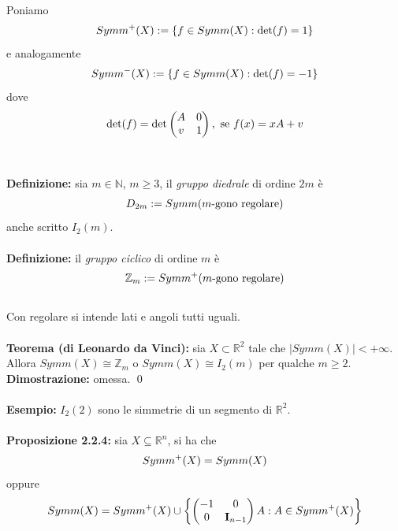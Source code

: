 \documentclass{article}
\begin{document}
Poniamo
\begin{gather}
    Symm^+(X) := \{ f \in Symm(X) : \det (f) = 1 \} \notag
\end{gather}
e analogamente
\begin{gather}
    Symm^-(X) := \{ f \in Symm(X) : \det (f) = -1 \} \notag
\end{gather}
dove
\begin{gather}
    \det (f) = \det \begin{pmatrix}
        A & 0 \\
        v & 1
    \end{pmatrix}, \text{ se } f(x) = xA + v \notag
\end{gather} \\ \\
\textbf{Definizione:} sia $m \in \mathbb{N}$, $m \geq 3$, il \textit{gruppo diedrale} di ordine $2m$ è
\begin{gather}
    D_{2m} := Symm(m\text{-gono regolare}) \notag
\end{gather}
anche scritto $I_2(m)$. \\ \\
\textbf{Definizione:} il \textit{gruppo ciclico} di ordine $m$ è
\begin{gather}
    \mathbb{Z}_m := Symm^+(m\text{-gono regolare}) \notag
\end{gather} \\
Con regolare si intende lati e angoli tutti uguali. \\ \\
\textbf{Teorema (di Leonardo da Vinci):} sia $X \subset \mathbb{R}^2$ tale che $|Symm(X)| < +\infty$. Allora $Symm(X) \cong \mathbb{Z}_m$ o $Symm(X) \cong I_2(m)$ per qualche $m \geq 2$. \\

\textbf{Dimostrazione:} omessa. \qed \\ \\
\textbf{Esempio:} $I_2(2)$ sono le simmetrie di un segmento di $\mathbb{R}^2$. \\ \\
\textbf{Proposizione 2.2.4:} sia $X \subseteq \mathbb{R}^n$, si ha che
\begin{gather}
    Symm^+(X) = Symm(X) \notag
\end{gather}
oppure
\begin{gather}
    Symm(X) = Symm^+(X) \cup \left\{ \begin{pmatrix}
        -1 & 0 \\
        0 & \mathbf{I}_{n - 1}
    \end{pmatrix} A : A \in Symm^+(X) \right\} \notag
\end{gather} \\
\end{document}
